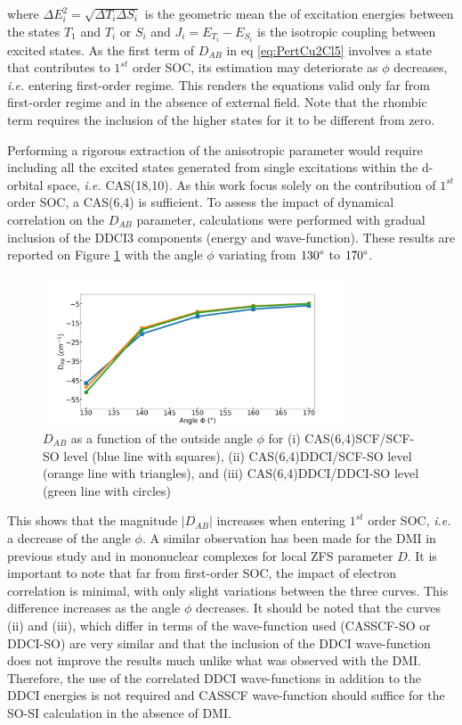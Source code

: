 \documentclass[12pt]{report}
\numberwithin{equation}{section}
\begin{document}
where $\Delta E^2_i=\sqrt{\Delta T_i \Delta S_i}$ is the geometric mean the of excitation energies between the states $T_1$ and $T_i$ or $S_i$ and $J_i=E_{T_i}-E_{S_i}$ is the isotropic coupling between excited states.
As the first term of $D_{AB}$ in eq \ref{eq:PertCu2Cl5} involves a state that contributes to $1^{st}$ order SOC, its estimation may deteriorate as $\phi$ decreases, \textit{i.e.} entering first-order regime.
This renders the equations valid only far from first-order regime and in the absence of external field. Note that the rhombic term requires the inclusion of the higher states for it to be different from zero.

Performing a rigorous extraction of the anisotropic parameter would require including all the excited states generated from single excitations within the d-orbital space, \textit{i.e.} CAS(18,10).
As this work focus solely on the contribution of $1^{st}$ order SOC, a CAS(6,4) is sufficient. 
To assess the impact of dynamical correlation on the $D_{AB}$ parameter, calculations were performed with gradual inclusion of the DDCI3 components (energy and wave-function).
These results are reported on Figure \ref{DABangle} with the angle $\phi$ variating from $130\degree$ to $170\degree$.

\begin{figure}[!ht]
    \centering
    \includegraphics[width=0.8\textwidth]{Images/D_AB_Angle2.png}
    \caption[$D_{AB}$ as a function of the outside angle $\phi$ for different levels of calculations]{$D_{AB}$ as a function of the outside angle $\phi$ for (i) CAS(6,4)SCF/SCF-SO level (blue line with squares), (ii) CAS(6,4)DDCI/SCF-SO level (orange line with triangles), and (iii) CAS(6,4)DDCI/DDCI-SO level (green line with circles)}
    \label{DABangle}
\end{figure}

This shows that the magnitude $|D_{AB}|$ increases when entering $1^{st}$ order SOC, \textit{i.e.} a decrease of the angle $\phi$.
A similar observation has been made for the DMI in previous study and in mononuclear complexes for local ZFS parameter $D$.
It is important to note that far from first-order SOC, the impact of electron correlation is minimal, with only slight variations between the three curves.
This difference increases as the angle $\phi$ decreases.
It should be noted that the curves (ii) and (iii), which differ in terms of the wave-function used (CASSCF-SO or DDCI-SO) are very similar and that the inclusion of the DDCI wave-function does not improve the results much unlike what was observed with the DMI.
Therefore, the use of the correlated DDCI wave-functions in addition to the DDCI energies is not required and CASSCF wave-function should suffice for the SO-SI calculation in the absence of DMI. 
\end{document}
